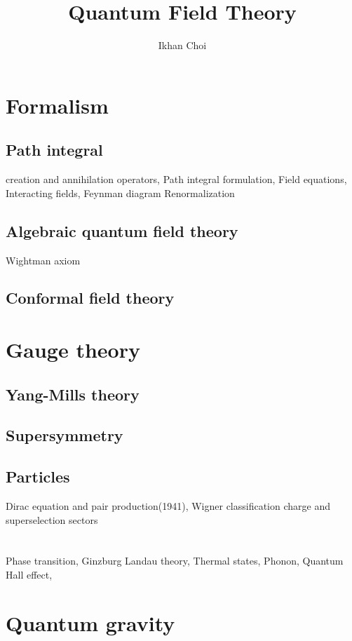 \documentclass{../../large}
\begin{document}
\title{Quantum Field Theory}
\author{Ikhan Choi}
\maketitle
\tableofcontents


\part{Formalism}

\chapter{Path integral}
creation and annihilation operators,
Path integral formulation,
Field equations,
Interacting fields,
Feynman diagram
Renormalization

\chapter{Algebraic quantum field theory}
Wightman axiom

\chapter{Conformal field theory}





\part{Gauge theory}

\chapter{Yang-Mills theory}
\chapter{Supersymmetry}
\chapter{Particles}
Dirac equation and pair production(1941),
Wigner classification
charge and superselection sectors




\part{}

\chapter{}
Phase transition,
Ginzburg Landau theory,
Thermal states,
Phonon,
Quantum Hall effect,

\chapter{}

\chapter{}




\part{Quantum gravity}
\end{document}
